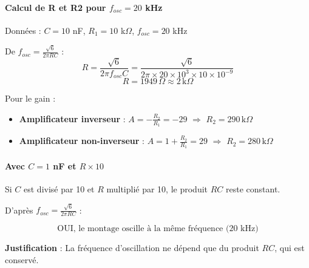 \documentclass[11pt,a4paper]{article}
\begin{document}
\paragraph{Calcul de R et R2 pour $f_{osc} = 20$ kHz}
Données : $C = 10$ nF, $R_1 = 10$ k$\Omega$, $f_{osc} = 20$ kHz

De $f_{osc} = \frac{\sqrt{6}}{2\pi RC}$ :
\begin{equation}
R = \frac{\sqrt{6}}{2\pi f_{osc} C} = \frac{\sqrt{6}}{2\pi \times 20 \times 10^3 \times 10 \times 10^{-9}}
\end{equation}
\begin{equation}
\boxed{R = 1949 \, \Omega \approx 2 \, \text{k}\Omega}
\end{equation}

Pour le gain :
\begin{itemize}
    \item \textbf{Amplificateur inverseur} : $A = -\frac{R_2}{R_1} = -29$ $\Rightarrow$ $\boxed{R_2 = 290 \, \text{k}\Omega}$
    \item \textbf{Amplificateur non-inverseur} : $A = 1 + \frac{R_2}{R_1} = 29$ $\Rightarrow$ $\boxed{R_2 = 280 \, \text{k}\Omega}$
\end{itemize}

\paragraph{Avec $C = 1$ nF et $R \times 10$}

Si $C$ est divisé par 10 et $R$ multiplié par 10, le produit $RC$ reste constant.

D'après $f_{osc} = \frac{\sqrt{6}}{2\pi RC}$ :

\begin{equation}
\boxed{\text{OUI, le montage oscille à la même fréquence (20 kHz)}}
\end{equation}

\textbf{Justification} : La fréquence d'oscillation ne dépend que du produit $RC$, qui est conservé.

\vspace{1cm}
\end{document}
